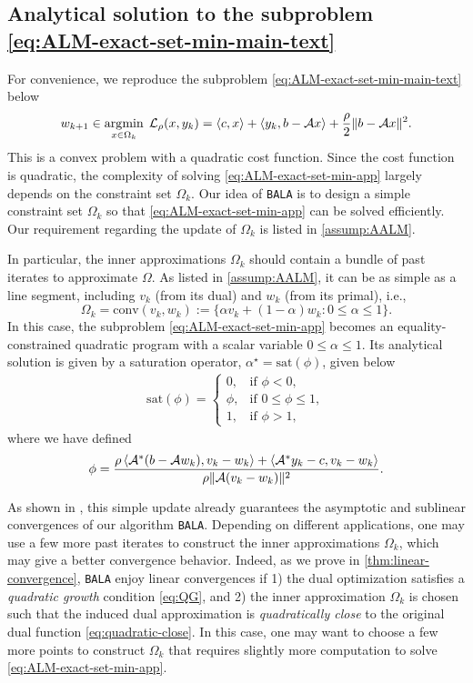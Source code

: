 \documentclass[11pt]{article}
\newcommand{\alg}{\texttt{BALA}}%
\begin{document}
\subsection{Analytical solution to the subproblem \cref{eq:ALM-exact-set-min-main-text}}

For convenience, we reproduce the subproblem \cref{eq:ALM-exact-set-min-main-text} below 
\begin{equation}
 \label{eq:ALM-exact-set-min-app}
    w_{k+1} \in \operatorname*{\arg\!\min}_{x \in \Omega_{k}}\; \mathcal{L}_{\rho}(x,y_k) = \left \langle c, x \right\rangle + \left \langle y_k, b-\mathcal{A} x \right\rangle + \frac{\rho}{2}\|b - \mathcal{A} x \|^2. 
\end{equation}
This is a convex problem with a quadratic cost function. Since the cost function is quadratic, the complexity of solving \cref{eq:ALM-exact-set-min-app} largely depends on the constraint set $\Omega_{k}$. Our idea of \alg{} is to design a simple constraint set $\Omega_k$ so that \cref{eq:ALM-exact-set-min-app} can be solved efficiently. Our requirement regarding the update of $\Omega_{k}$ is listed in \cref{assump:AALM}. 


In particular, the inner approximations $\Omega_{k}$ should contain a bundle of past iterates to approximate $\Omega$. As listed in \cref{assump:AALM}, it can be as simple as a line segment, including $v_{k}$ (from its dual) and $w_{k}$ (from its primal), i.e., 
$$
\Omega_k = \mathrm{conv}(v_k,w_{k}) := \{\alpha  v_k + (1-\alpha)  w_k :  0 \leq \alpha \leq 1 \}.
$$ In this case, the subproblem \cref{eq:ALM-exact-set-min-app} becomes an equality-constrained quadratic program with a scalar variable $0 \leq \alpha \leq 1$. Its analytical solution is given by a saturation operator, $\alpha^\star = \mathrm{sat}(\phi)$, given below   
\begin{align*}
   \mathrm{sat}(\phi) = \begin{cases}
        0, &\text{if } \phi < 0, \\
        \phi, &\text{if }  0 \leq \phi \leq 1,  \\
        1, &\text{if } \phi > 1,
    \end{cases}
\end{align*}
where we have defined 
$$
\phi = \frac{\rho \left \langle \mathcal{A}^* (b-\mathcal{A} w_{k}), v_k - w_k \right\rangle + \left \langle \mathcal{A}^* y_k - c ,  v_k - w_k \right\rangle }{\rho \|\mathcal{A} (v_k - w_k)\|^2}.
$$

As shown in , this simple update already guarantees the asymptotic and sublinear convergences of our algorithm \alg{}. Depending on different applications, one may use a few more past iterates to construct the inner approximations $\Omega_k$, which may give a better convergence behavior. Indeed, as we prove in \cref{thm:linear-convergence},  \alg{} enjoy linear convergences if 1) the dual optimization satisfies a \textit{quadratic growth} condition \cref{eq:QG}, and 2) the inner approximation $\Omega_k$ is chosen such that the induced dual approximation is \textit{quadratically close} to the original dual function \cref{eq:quadratic-close}. In this case, one may want to choose a few more points to construct $\Omega_k$ that requires slightly more computation to solve \cref{eq:ALM-exact-set-min-app}. 
\end{document}
